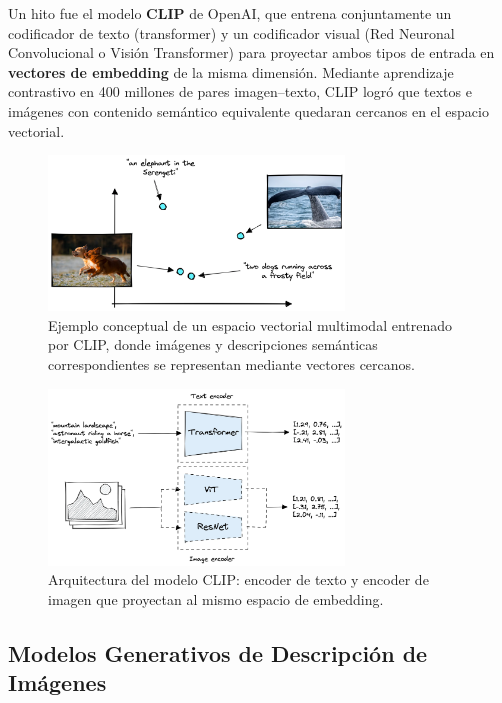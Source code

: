 Un hito fue el modelo \textbf{CLIP} de OpenAI, que entrena conjuntamente un codificador de texto (transformer) y un codificador visual (Red Neuronal Convolucional o Visión Transformer) para proyectar ambos tipos de entrada en \textbf{vectores de embedding} de la misma dimensión. Mediante aprendizaje contrastivo en 400 millones de pares imagen--texto, CLIP logró que textos e imágenes con contenido semántico equivalente quedaran cercanos en el espacio vectorial.

\begin{figure}[h]
  \centering
  \includegraphics[width=0.7\textwidth]{archivos/clip_space.png}
  \caption{Ejemplo conceptual de un espacio vectorial multimodal entrenado por CLIP, donde imágenes y descripciones semánticas correspondientes se representan mediante vectores cercanos.}
  \label{fig:clip_space}
\end{figure}

\begin{figure}[h]
  \centering
  \includegraphics[width=0.7\textwidth]{archivos/clip_architecture.png}
  \caption{Arquitectura del modelo CLIP: encoder de texto y encoder de imagen que proyectan al mismo espacio de embedding.}
  \label{fig:clip_architecture}
\end{figure}

\subsection{Modelos Generativos de Descripción de Imágenes}

